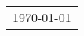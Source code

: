 
\begin{titlepage}
	\null\vfill
	
	\begin{center}
		
		{\Huge \proposalTitle}
		\vskip 2cm
		
		{\Large \authorName}
		\vskip 1cm
		
		{\large \authorUniversity\\
				\authorAddress \\
				\texttt{\authorEmail} \\}
	\end{center}
	
	\vfill
	\vfill
	
	\centering
	\begin{tabular}{r}
		\today \\
	\end{tabular}
\end{titlepage}

